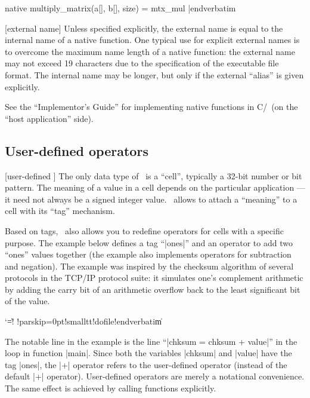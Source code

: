 native multiply_matrix(a[], b[], size) = mtx_mul
|endverbatim\endlistingx

[external name] 
Unless specified explicitly, the external name is equal to the internal name
of a native function. One typical use for explicit external names is to overcome
the maximum name length of a native function: the external name may not exceed
19 characters due to the specification of the executable file format. The
internal name may be longer, but only if the external ``alias'' is given
explicitly.

See the ``Implementor's Guide'' %
for implementing native functions in C/\Cpp\ (on the ``host application'' side).


\subsection{User-defined operators}
[user-defined \midtilde]
\noindent{}%
The only data type of \Small\ is a ``cell'', typically a 32-bit number or
bit pattern. The meaning of a value in a cell depends on the particular
application ---it need not always be a signed integer value. \Small\ allows
to attach a ``meaning'' to a cell with its ``tag'' mechanism.

Based on tags, \Small\ also allows you to redefine operators for cells with
a specific purpose. The example below defines a tag ``|ones|'' and an operator
to add two ``ones'' values together (the example also implements operators for
subtraction and negation). The example was inspired by the checksum
algorithm of several protocols in the TCP/IP protocol suite: it simulates
one's complement arithmetic by adding the carry bit of an arithmetic overflow
back to the least significant bit of the value.

\goodbreak
{}
\begingroup\catcode`\|=\other\verbatimescapechar!
\verbatim!parskip=0pt!smalltt!dofile!endverbatim\verbatimescapechar\|\endlistingx
\endgroup

The notable line in the example is the line ``|chksum = chksum + value|'' in
the loop in function |main|. Since both the variables |chksum| and |value|
have the tag |ones|, the |+| operator refers to the user-defined operator
(instead of the default |+| operator). User-defined operators are merely a
notational convenience. The same effect is achieved by calling functions
explicitly.

